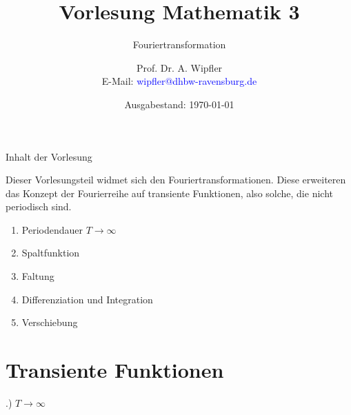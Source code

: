 \documentclass[t,14pt]{beamer}
\title[]{Vorlesung Mathematik 3}
\subtitle{Fouriertransformation}
\author[]{Prof. Dr. A. Wipfler\\ E-Mail: \textcolor{blue}{wipfler@dhbw-ravensburg.de}}
\institute[]{{\footnotesize Duale Hochschule Baden-W\"urttemberg, Ravensburg/Friedrichshafen}}
\date[]{Ausgabestand: \today}
\begin{document}
\begin{frame}
\titlepage
\end{frame}





\begin{frame}{Inhalt der Vorlesung}


Dieser Vorlesungsteil widmet sich den Fouriertransformationen. Diese erweiteren das Konzept der Fourierreihe
auf transiente Funktionen, also solche, die nicht periodisch sind.
\begin{enumerate}
\item Periodendauer $T\to\infty$
\item Spaltfunktion
\item Faltung
\item Differenziation und Integration
\item Verschiebung
\end{enumerate}

\end{frame}

\section{Transiente Funktionen}
\begin{frame}{\thesection .) $T\to\infty$}

\end{frame}




\end{document}
